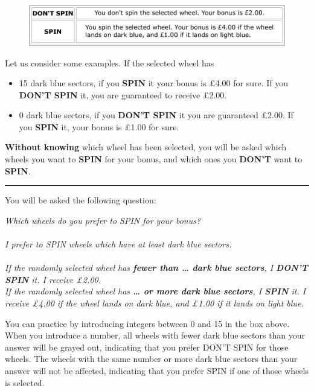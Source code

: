\begin{figure}[h!]
	\centering
	{\includegraphics[width=\linewidth]{Options.pdf}}
\end{figure}

\noindent Let us consider some examples. If the selected wheel has
\begin{itemize}
\item 15 dark blue sectors, if you \textbf{SPIN} it your bonus is £4.00 for sure.
If you \textbf{DON'T SPIN} it, you are guaranteed to receive £2.00.
\item 0 dark blue sectors, if you \textbf{DON'T SPIN} it you are guaranteed £2.00.
If you \textbf{SPIN} it, your bonus is £1.00 for sure.
\end{itemize}

\noindent \textbf{Without knowing} which wheel has been selected, you will be asked which wheels you want to \textbf{SPIN} for your bonus, and which ones you \textbf{DON'T} want to \textbf{SPIN}.

\bigskip
\noindent \rule{\linewidth}{0.4pt}

\noindent You will be asked the following question:

\begin{mdframed}[backgroundcolor=LightBlue, linecolor=white]
\noindent \textit{Which wheels do you prefer to SPIN for your bonus?} \\
\\
\noindent \textit{I prefer to SPIN wheels which have at least \framebox[0.1\textwidth]{\rule{0pt}{15pt}} dark blue sectors.} \\
\\
\noindent \textit{If the randomly selected wheel has \textbf{fewer than … dark blue sectors}, I \textbf{DON’T SPIN} it.
I receive £2.00.} \\
\textit{If the randomly selected wheel has \textbf{… or more dark blue sectors}, I \textbf{SPIN} it.
I receive £4.00 if the wheel lands on dark blue, and £1.00 if it lands on light blue.}
\end{mdframed}

\noindent You can practice by introducing integers between 0 and 15 in the box above.
When you introduce a number, all wheels with fewer dark blue sectors than your answer will be grayed out, indicating that you prefer DON'T SPIN for those wheels.
The wheels with the same number or more dark blue sectors than your answer will not be affected, indicating that you prefer SPIN if one of those wheels is selected.


